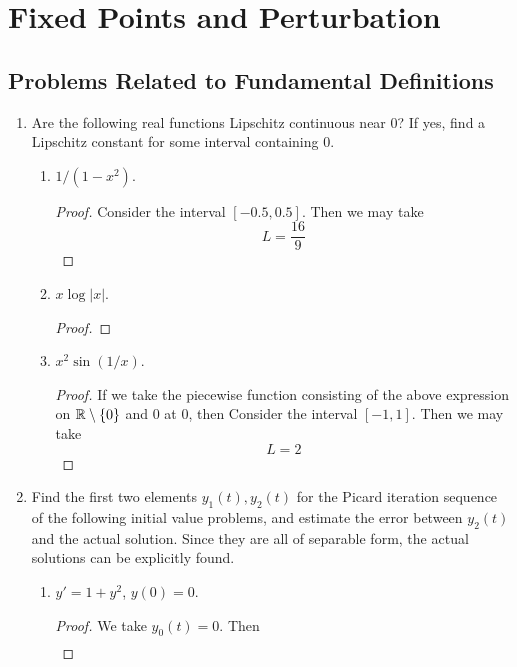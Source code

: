 \documentclass[../psets.tex]{subfiles}
\begin{document}
\section{Fixed Points and Perturbation}
\subsection*{Problems Related to Fundamental Definitions}
\begin{enumerate}
    \item {}Are the following real functions Lipschitz continuous near 0? If yes, find a Lipschitz constant for some interval containing 0.
    \begin{enumerate}
        \item $1/(1-x^2)$.
        \begin{proof}
             Consider the interval $[-0.5,0.5]$. Then we may take
            \begin{equation*}
                \boxed{L = \frac{16}{9}}
            \end{equation*}
        \end{proof}
        \item $x\log|x|$.
        \begin{proof}
        \end{proof}
        \item $x^2\sin(1/x)$.
        \begin{proof}
            If we take the piecewise function consisting of the above expression on $\mathbb{R}\setminus\{0\}$ and 0 at 0, then  Consider the interval $[-1,1]$. Then we may take
            \begin{equation*}
                \boxed{L = 2}
            \end{equation*}
        \end{proof}
    \end{enumerate}
    \item Find the first two elements $y_1(t),y_2(t)$ for the Picard iteration sequence of the following initial value problems, and estimate the error between $y_2(t)$ and the actual solution. Since they are all of separable form, the actual solutions can be explicitly found.
    \begin{enumerate}
        \item $y'=1+y^2$, $y(0)=0$.
        \begin{proof}
            We take $y_0(t)=0$. Then
            \begin{align*}

\end{align*}
\end{proof}
\end{enumerate}
\end{enumerate}
\end{document}
